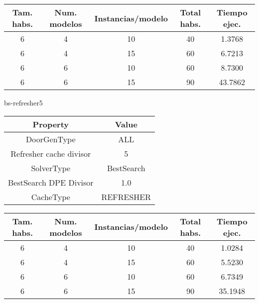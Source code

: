 \begin{center}
	\begin{tabular}{ | c | c | c | c | c | }
\hline
Tam. habs. & Num. modelos & Instancias/modelo & Total habs. & Tiempo ejec. \\ \hline 
6 & 4 & 10 & 40 & 1.3768 \\ 
6 & 4 & 15 & 60 & 6.7213 \\ 
6 & 6 & 10 & 60 & 8.7300 \\ 
6 & 6 & 15 & 90 & 43.7862 \\ 
\hline
	\end{tabular}
\end{center}

bs-refresher5
\begin{center}
	\begin{tabular}{ | c | c | }
\hline
 		Property & Value \\ \hline
DoorGenType & ALL \\ 
Refresher cache divisor & 5 \\ 
SolverType & BestSearch \\ 
BestSearch DPE Divisor & 1.0 \\ 
CacheType & REFRESHER \\ 
\hline
	\end{tabular}
\end{center}

\begin{center}
	\begin{tabular}{ | c | c | c | c | c | }
\hline
Tam. habs. & Num. modelos & Instancias/modelo & Total habs. & Tiempo ejec. \\ \hline 
6 & 4 & 10 & 40 & 1.0284 \\ 
6 & 4 & 15 & 60 & 5.5230 \\ 
6 & 6 & 10 & 60 & 6.7349 \\ 
6 & 6 & 15 & 90 & 35.1948 \\ 
\hline
	\end{tabular}
\end{center}


